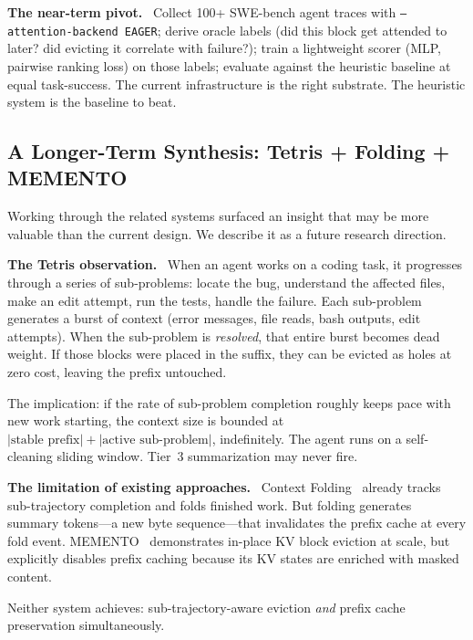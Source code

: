 \documentclass[letterpaper,twocolumn,10pt]{article}
\newcommand{\para}[1]{\smallskip\noindent\textbf{#1.}\ }
\begin{document}
\para{The near-term pivot} Collect 100+ SWE-bench agent traces with
\texttt{--attention-backend EAGER}; derive oracle labels (did this block get
attended to later? did evicting it correlate with failure?); train a
lightweight scorer (MLP, pairwise ranking loss) on those labels; evaluate
against the heuristic baseline at equal task-success. The current
infrastructure is the right substrate. The heuristic system is the baseline
to beat.

\subsection{A Longer-Term Synthesis: Tetris + Folding + MEMENTO}
\label{sec:tetris}

Working through the related systems surfaced an insight that may be more
valuable than the current design. We describe it as a future research
direction.

\para{The Tetris observation} When an agent works on a coding task, it
progresses through a series of sub-problems: locate the bug, understand the
affected files, make an edit attempt, run the tests, handle the failure.
Each sub-problem generates a burst of context (error messages, file reads,
bash outputs, edit attempts). When the sub-problem is \emph{resolved}, that
entire burst becomes dead weight. If those blocks were placed in the suffix,
they can be evicted as holes at zero cost, leaving the prefix untouched.

The implication: if the rate of sub-problem completion roughly keeps pace
with new work starting, the context size is bounded at
$|\text{stable prefix}| + |\text{active sub-problem}|$, indefinitely. The
agent runs on a self-cleaning sliding window. Tier~3 summarization may never
fire.

\para{The limitation of existing approaches} Context Folding~\cite{sun2025contextfolding} already tracks sub-trajectory completion and folds finished
work. But folding generates summary tokens---a new byte sequence---that
invalidates the prefix cache at every fold event.
MEMENTO~\cite{kontonis2026memento} demonstrates in-place KV block eviction
at scale, but explicitly disables prefix caching because its KV states are
enriched with masked content.

Neither system achieves: sub-trajectory-aware eviction \emph{and} prefix
cache preservation simultaneously.
\end{document}
